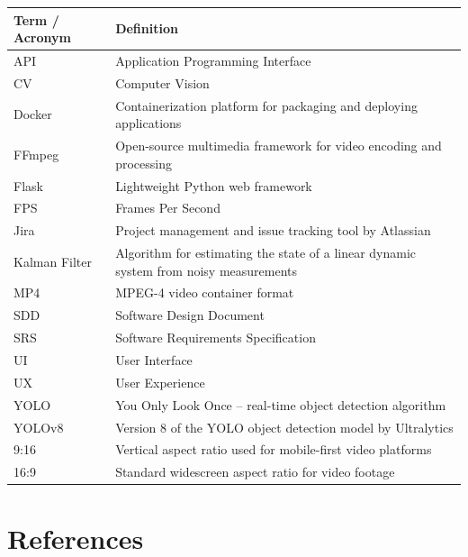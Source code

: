 \documentclass[12pt]{article}
\begin{document}
\begin{tabularx}{\textwidth}{|l|X|}
    \hline
    \textbf{Term / Acronym} & \textbf{Definition} \\
    \hline
    API   & Application Programming Interface \\
    \hline
    CV    & Computer Vision \\
    \hline
    Docker & Containerization platform for packaging and deploying applications \\
    \hline
    FFmpeg & Open-source multimedia framework for video encoding and processing \\
    \hline
    Flask & Lightweight Python web framework \\
    \hline
    FPS   & Frames Per Second \\
    \hline
    Jira  & Project management and issue tracking tool by Atlassian \\
    \hline
    Kalman Filter & Algorithm for estimating the state of a linear dynamic system from noisy measurements \\
    \hline
    MP4   & MPEG-4 video container format \\
    \hline
    SDD   & Software Design Document \\
    \hline
    SRS   & Software Requirements Specification \\
    \hline
    UI    & User Interface \\
    \hline
    UX    & User Experience \\
    \hline
    YOLO  & You Only Look Once -- real-time object detection algorithm \\
    \hline
    YOLOv8 & Version 8 of the YOLO object detection model by Ultralytics \\
    \hline
    9:16  & Vertical aspect ratio used for mobile-first video platforms \\
    \hline
    16:9  & Standard widescreen aspect ratio for video footage \\
    \hline
\end{tabularx}

\newpage

\section{References}
\end{document}
